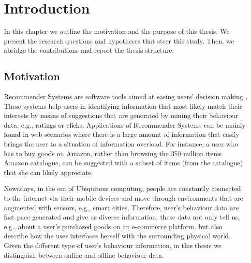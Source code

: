 
\chapter{Introduction}  %

\ifpdf
    \graphicspath{{Chapter1/Figs/Raster/}{Chapter1/Figs/PDF/}{Chapter1/Figs/}}
\else
    \graphicspath{{Chapter1/Figs/Vector/}{Chapter1/Figs/}}
\fi



In this chapter we outline the motivation and the purpose of this thesis. We present the research questions and hypotheses that steer this study. Then, we abridge the contributions and report the thesis structure.

\section{Motivation}
Recommender Systems are software tools aimed at easing users' decision making \cite{RSdef:2015}. These systems help users in identifying information that most likely match their interests by means of suggestions that are generated by mining their behaviour data, e.g., ratings or clicks. %
Applications of Recommender Systems can be mainly found in web scenarios where there is a large amount of information that easily brings the user to a situation of information overload. For instance, a user who has to buy goods on Amazon, rather than browsing the 350 million items Amazon catalogue, can be suggested with a subset of items (from the catalogue) that she can likely appreciate. 

Nowadays, in the era of Ubiquitous computing, people are constantly connected to the internet via their mobile devices and move through environments that are augmented with sensors, e.g., smart cities. Therefore, user's behaviour data are fast pace generated and give us diverse information: these data not only tell us, e.g., about a user's purchased goods on an e-commerce platform, but also describe how the user interfaces herself with the surrounding physical world. Given the different type of user's behaviour information, in this thesis we distinguish between online and offline behaviour data. 

